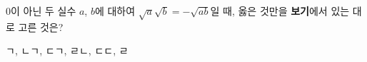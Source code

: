 0이 아닌 두 실수 $a$, $b$에 대하여 $\sqrt{a}\sqrt{b}=-\sqrt{ab}$일 때, 옳은 것만을 \textbf{보기}에서 있는 대로 고른 것은? 
\begin{choices32}{ㄱ, ㄴ}{ㄱ, ㄷ}{ㄱ, ㄹ}{ㄴ, ㄷ}{ㄷ, ㄹ}\end{choices32}
